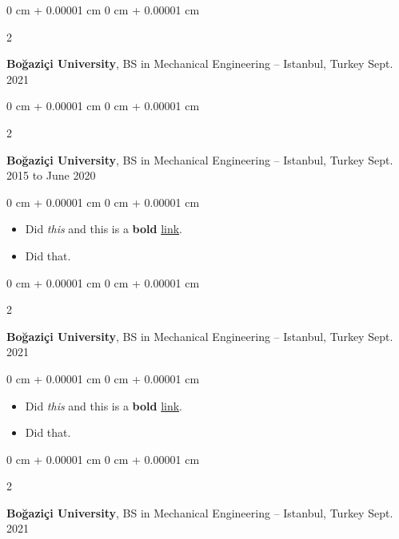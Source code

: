 \documentclass[10pt, letterpaper]{article}
\newenvironment{highlights}{
    \begin{itemize}[
        topsep=0.10 cm,
        parsep=0.10 cm,
        partopsep=0pt,
        itemsep=0pt,
        leftmargin=0 cm + 10pt
    ]
}{
    \end{itemize}
        
    \vspace{-0.10cm}
} %
\newenvironment{onecolentry}{
    \begin{adjustwidth}{
        0 cm + 0.00001 cm
    }{
        0 cm + 0.00001 cm
    }
}{
    \end{adjustwidth}
} %
\newenvironment{twocolentry}[2][]{
    \onecolentry
    \def\secondColumn{#2}
    \setcolumnwidth{\fill, 4.1 cm}
    \begin{paracol}{2}
}{
    \switchcolumn \raggedleft \secondColumn
    \end{paracol}
    \endonecolentry
} %
\begin{document}
        \begin{twocolentry}{
            Sept. 2021
        }
            \textbf{Boğaziçi University}, BS in Mechanical Engineering -- Istanbul, Turkey\end{twocolentry}

        \vspace{0.10 cm}


        \vspace{0.15 cm}

        \begin{twocolentry}{
            Sept. 2015 to June 2020
        }
            \textbf{Boğaziçi University}, BS in Mechanical Engineering -- Istanbul, Turkey\end{twocolentry}

        \vspace{0.10 cm}
        \begin{onecolentry}
            \begin{highlights}
                \item Did \textit{this} and this is a \textbf{bold} \href{https://example.com}{link}.
                \item Did that.
            \end{highlights}
        \end{onecolentry}


        \vspace{0.15 cm}

        \begin{twocolentry}{
            Sept. 2021
        }
            \textbf{Boğaziçi University}, BS in Mechanical Engineering -- Istanbul, Turkey\end{twocolentry}

        \vspace{0.10 cm}
        \begin{onecolentry}
            \begin{highlights}
                \item Did \textit{this} and this is a \textbf{bold} \href{https://example.com}{link}.
                \item Did that.
            \end{highlights}
        \end{onecolentry}


        \vspace{0.15 cm}

        \begin{twocolentry}{
            Sept. 2021
        }
            \textbf{Boğaziçi University}, BS in Mechanical Engineering -- Istanbul, Turkey\end{twocolentry}
\end{document}
